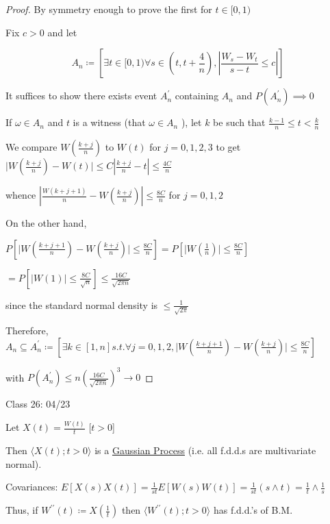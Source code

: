 \documentclass{article}
\theoremstyle{definition}
\begin{document}
\begin{proof}
    By symmetry enough to prove the first for \(t\in [0,1)\) 

    Fix \(c > 0\) and let 

    \[
        A_n \coloneqq \left[ \exists t \in [0,1) \forall s \in (t, t+\frac{4}{n}), \left\vert \frac{W_s - W_t}{s-t} \leq c \right\vert  \right] 
    \]

    It suffices to show there exists event \(A_n^{\prime} \) containing \(A_n\) and \(P(A_n^{\prime} )\implies 0\)
    
    If \(\omega \in A_n\) and \(t\) is a witness (that \(\omega \in A_n\) ), let \(k\) be such that \(\frac{k-1}{n} \leq t < \frac{k}{n}\)
    
    We compare \(W \left( \frac{k+j}{n} \right) \) to \(W(t)\) for \(j=0,1,2,3\) to get \(\vert W(\frac{k+j}{n})- W(t) \vert \leq C \left\vert \frac{k+j}{n} - t \right\vert \leq \frac{4C}{n} \) 

    whence \(\left\vert \frac{W(k+j+1)}{n} - W(\frac{k+j}{n}) \right\vert \leq \frac{8C}{n}\) for \(j=0,1,2\) 

    On the other hand,

    \(P[\vert W(\frac{k+j+1}{n}) - W(\frac{k+j}{n}) \vert  \leq \frac{8C}{n}] = P[\vert W(\frac{1}{n}) \vert \leq \frac{8C}{n}]\) 

    \(=P[\vert W(1) \vert \leq \frac{8C}{\sqrt{n}}] \leq \frac{16C}{\sqrt{2\pi n}}\) 

    since the standard normal density is \(\leq \frac{1}{\sqrt{2\pi}}\) 

    Therefore, \(A_n \subseteq A_n^{\prime} \coloneqq \left[ \exists k\in [1,n] s.t. \forall j = 0,1,2, \vert W(\frac{k+j+1}{n}) - W(\frac{k+j}{n}) \vert \leq \frac{8C}{n} \right] \) 
    
    with \(P(A_n^{\prime}) \leq n \left( \frac{16C}{\sqrt{2\pi n} } \right)^3 \to 0 \) 
    
\end{proof}

\hrulefill

Class 26: 04/23

Let \(X(t) = \frac{W(t)}{t}\) [\(t > 0\)]

Then \(\langle X(t) ; t > 0 \rangle\) is a \underline{Gaussian Process} (i.e. all f.d.d.s are multivariate normal).

Covariances: \(E[X(s)X(t)] = \frac{1}{st} E[W(s)W(t)]=\frac{1}{s t}(s\land t)=\frac{1}{t}\land \frac{1}{s}\)

Thus, if \(W^{\prime\prime} (t) \coloneqq X(\frac{1}{t})\) then \(\langle W^{\prime\prime} (t); t > 0 \rangle \)  has f.d.d.'s of B.M.
\end{document}

